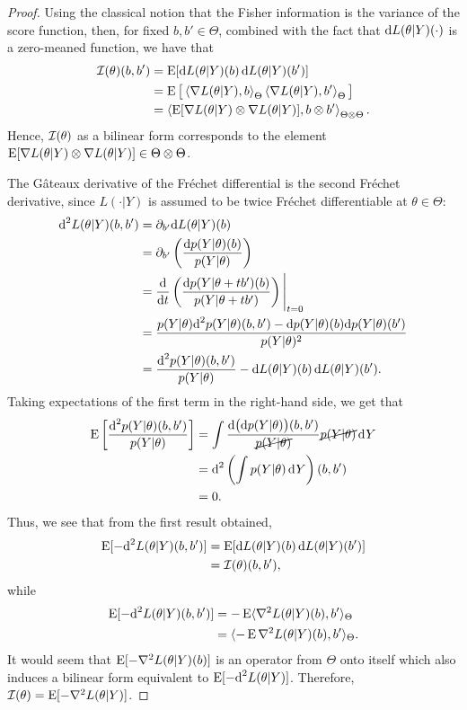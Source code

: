 \begin{proof}
Using the classical notion that the Fisher information is the variance of the score function, then, for fixed $b,b'\in\Theta$, combined with the fact that $\text{d} L(\theta|Y)(\cdot)$ is a zero-meaned function, we have that 
\begin{align*}
  {\mathcal I}(\theta)(b,b') 
  &= \operatorname{E} [ \text{d} L(\theta|Y)(b) \, \text{d} L(\theta|Y)(b') ] \\
  &= \operatorname{E} \big[ \left\langle \nabla L(\theta|Y) , b \right\rangle_\Theta \left\langle \nabla L(\theta|Y) , b' \right\rangle_\Theta \big] \\
  &= \left\langle \operatorname{E} [\nabla L(\theta|Y) \otimes \nabla L(\theta|Y)] , b \otimes b' \right\rangle_{\Theta\otimes\Theta}.
\end{align*}
Hence, ${\mathcal I}(\theta)$ as a bilinear form corresponds to the element $\operatorname{E} [\nabla L(\theta|Y) \otimes \nabla L(\theta|Y)] \in \Theta\otimes\Theta$.

The Gâteaux derivative of the Fréchet differential is the second Fréchet derivative, since $L(\cdot|Y)$ is assumed to be twice Fréchet differentiable at $\theta\in\Theta$:
\begin{align*}
  \text{d}^2 L(\theta|Y)(b,b') 
  &= \partial_{b'} \text{d} L(\theta|Y)(b) \\
  &= \partial_{b'} \left( \frac{\text{d} p(Y|\theta)(b)}{p(Y|\theta)} \right) \\
  &= \frac{\text{d}}{\text{d} t} \left( \frac{\text{d} p(Y|\theta + tb')(b)}{p(Y|\theta + tb')} \right) \Bigg|_{t=0} \\
  &= \frac{p(Y|\theta)\text{d}^2 p(Y|\theta)(b,b') - \text{d} p(Y|\theta)(b)\text{d} p(Y|\theta)(b') }{p(Y|\theta)^2} \\
  &= \frac{\text{d}^2 p(Y|\theta)(b,b')  }{p(Y|\theta)} 
  - \text{d} L(\theta|Y)(b) \, \text{d} L(\theta|Y)(b').
\end{align*}
Taking expectations of the first term in the right-hand side, we get that
\begin{align*}
  \operatorname{E}\left[ \frac{\text{d}^2 p(Y|\theta)(b,b')}{p(Y|\theta)} \right] 
  &= \int \frac{\text{d} \big( \text{d} p(Y|\theta) \big)(b,b')}{\cancel{p(Y|\theta)}} \cancel{p(Y|\theta)} \operatorname{d}\hspace{0.5pt}\! Y   \\
  &= \text{d}^2 \left( \int p(Y|\theta) \operatorname{d}\hspace{0.5pt}\! Y \right)(b,b') \\
  &= 0.
\end{align*}
Thus, we see that from the first result obtained, 
\begin{align*}
  \operatorname{E} [-\text{d}^2 L(\theta|Y)(b,b') ]
  &= \operatorname{E}[\text{d} L(\theta|Y)(b) \, \text{d} L(\theta|Y)(b')] \\
  &= {\mathcal I}(\theta)(b,b'),
\end{align*}
while
\begin{align*}
  \operatorname{E} [-\text{d}^2 L(\theta|Y)(b,b') ]
  &= -\operatorname{E}\langle\nabla^2 L(\theta|Y)(b), b'\rangle_\Theta \\
  &= \langle-\operatorname{E} \nabla^2 L(\theta|Y)(b), b'\rangle_\Theta.
\end{align*}
It would seem that $\operatorname{E}[- \nabla^2 L(\theta|Y)(b)]$ is an operator from $\Theta$ onto itself which also induces a bilinear form equivalent to $\operatorname{E} [-\text{d}^2 L(\theta|Y)]$.
Therefore, ${\mathcal I}(\theta) = \operatorname{E}[- \nabla^2 L(\theta|Y)]$.
\end{proof}


